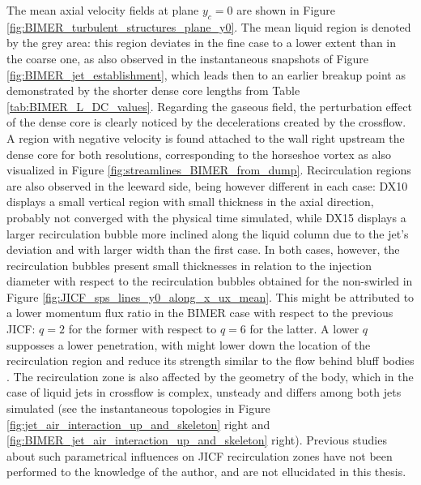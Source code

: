 The mean axial velocity fields at plane $y_c = 0$ are shown in Figure \ref{fig:BIMER_turbulent_structures_plane_y0}. The mean liquid region is denoted by the grey area: this region deviates in the fine case to a lower extent than in the coarse one, as also observed in the instantaneous snapshots of Figure \ref{fig:BIMER_jet_establishment}, which leads then to an earlier breakup point as demonstrated by the shorter dense core lengths from Table \ref{tab:BIMER_L_DC_values}. Regarding the gaseous field, the perturbation effect of the dense core is clearly noticed by the decelerations created by the crossflow. A region with negative velocity is found attached to the wall right upstream the dense core for both resolutions, corresponding to the horseshoe vortex as also visualized in Figure \ref{fig:streamlines_BIMER_from_dump}. Recirculation regions are also observed in the leeward side, being however different in each case: DX10 displays a small vertical region with small thickness in the axial direction, probably not converged with the physical time simulated, while DX15 displays a larger recirculation bubble more inclined along the liquid column due to the jet's deviation  and with larger width than the first case. In both cases, however, the recirculation bubbles present small thicknesses in relation to the injection diameter with respect to the recirculation bubbles obtained  for the non-swirled in Figure \ref{fig:JICF_sps_lines_y0_along_x_ux_mean}. This might be attributed to a lower momentum flux ratio in the BIMER case with respect to the previous JICF: $q = 2$ for the former with respect to $q = 6$ for the latter. A lower $q$ supposses a lower penetration, with might lower down the location of the recirculation region and reduce its strength similar to the flow behind bluff bodies . The recirculation zone is also affected by the geometry of the body, which in the case of liquid jets in crossflow is complex, unsteady and differs among both jets simulated (see the instantaneous topologies in Figure \ref{fig:jet_air_interaction_up_and_skeleton} right and \ref{fig:BIMER_jet_air_interaction_up_and_skeleton} right). Previous studies about such parametrical influences on JICF recirculation zones have not been performed to the knowledge of the author, and are not ellucidated in this thesis. 


